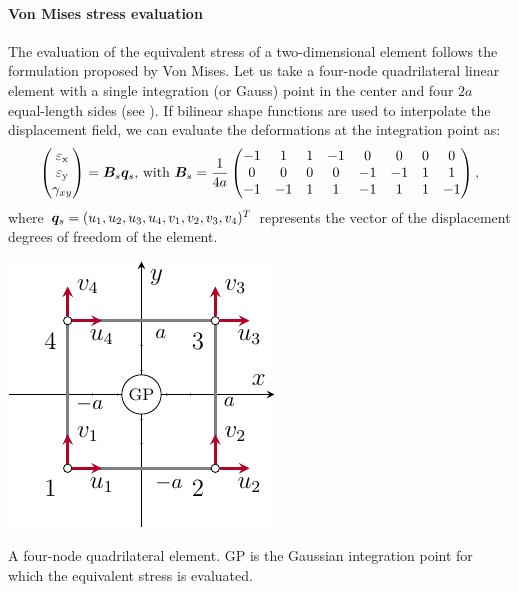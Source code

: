 \paragraph{Von Mises stress evaluation}
The evaluation of the equivalent stress of a two-dimensional element follows the formulation proposed by Von Mises. Let us take a four-node quadrilateral linear element with a single integration (or Gauss) point in the center and four $2a$ equal-length sides (see ). If bilinear shape functions are used to interpolate the displacement field, we can evaluate the deformations at the integration point as:
\begin{equation}
    \begin{pmatrix}
    \varepsilon_\text{x} \\
    \varepsilon_\text{y} \\
    \gamma_{xy}
    \end{pmatrix} = \bm{B}_s\bm{q}_s
    \textrm{,  with }
    \bm{B}_s =
    \frac{1}{4a}
    \begin{pmatrix}
    -1  &   1   &   1   &   -1  &   0   &   0   &   0   &   0   \\
    0   &   0   &   0   &   0   &   -1  &   -1  &   1   &   1   \\
    -1  &   -1  &   1   &   1   &   -1  &   1   &   1   &   -1
    \end{pmatrix},
\end{equation}
where $\bm{q}_s = (u_1, u_2, u_3, u_4, v_1, v_2, v_3, v_4)^T$ represents the vector of the displacement degrees of freedom of the element. 

\begin{marginfigure}
    \centering
    \includegraphics{figures/03_comparison_TO_TTO/03_gauss_point/gp.pdf}
    \caption{A four-node quadrilateral element. GP is the Gaussian integration point for which the equivalent stress is evaluated.}
    \label{fig:03_gp}
\end{marginfigure}



